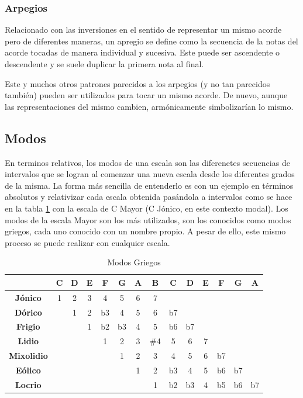 \subsubsection{Arpegios}\label{subsec:arpegios}

Relacionado con las inversiones en el sentido de representar un mismo acorde pero de diferentes maneras, un apregio se define como la secuencia de la notas del acorde tocadas de manera individual y sucesiva. Este puede ser ascendente o descendente y se suele duplicar la primera nota al final.

Este y muchos otros patrones parecidos a los arpegios (y no tan parecidos también) pueden ser utilizados para tocar un mismo acorde. De nuevo, aunque las representaciones del mismo cambien, armónicamente simbolizarían lo mismo.

\subsection{Modos}

En terminos relativos, los modos de una escala son las diferenetes secuencias de intervalos que se logran al comenzar una nueva escala desde los diferentes grados de la misma. La forma más sencilla de entenderlo es con un ejemplo en términos absolutos y relativizar cada escala obtenida pasándola a intervalos como se hace en la tabla \ref{tab:modos_C} con la escala de C Mayor (C Jónico, en este contexto modal). Los modos de la escala Mayor son los más utilizados, son los  conocidos como modos griegos, cada uno conocido con un nombre propio. A pesar de ello, este mismo proceso se puede realizar con cualquier escala.

\begin{table}[h]
    \centering
    \begin{tabular}{c|c|c|c|c|c|c|c|c|c|c|c|c|c}
        \multicolumn{1}{c}{}& \textbf{C} & D & E & F & G  & A & B & \textbf{C} & D & E & F & G & A\\
        \hline
        \hline
        \textbf{Jónico} & 1 & 2 & 3 & 4 & 5 & 6 & 7  \\
        \cline{0-8}
        \textbf{Dórico} & & 1 & 2 & b3 & 4 & 5 & 6 & b7 \\
        \cline{0-0}
        \cline{3-10}
        \textbf{Frigio} &\multicolumn{2}{c|}{} & 1 & b2 & b3 & 4 & 5 & b6 & b7 \\
        \cline{0-0}
        \cline{4-11}
        \textbf{Lidio} &\multicolumn{3}{c|}{} & 1 & 2 & 3 & \#4 & 5 & 6 & 7 \\
        \cline{0-0}
        \cline{5-12}
        \textbf{Mixolidio} &\multicolumn{4}{c|}{} & 1 & 2 & 3 & 4 & 5 & 6 & b7 \\
        \cline{0-0}
        \cline{6-13}
        \textbf{Eólico} &\multicolumn{5}{c|}{} & 1 & 2 & b3 & 4 & 5 & b6 & b7 \\
        \cline{0-0}
        \cline{7-14}
        \textbf{Locrio} &\multicolumn{6}{c|}{} & 1 & b2 & b3 & 4 & b5 & b6 & \multicolumn{1}{c|}{b7} \\      
        \cline{8-14}
    \end{tabular}
    \caption{Modos Griegos}
    \label{tab:modos_C}
\end{table}

